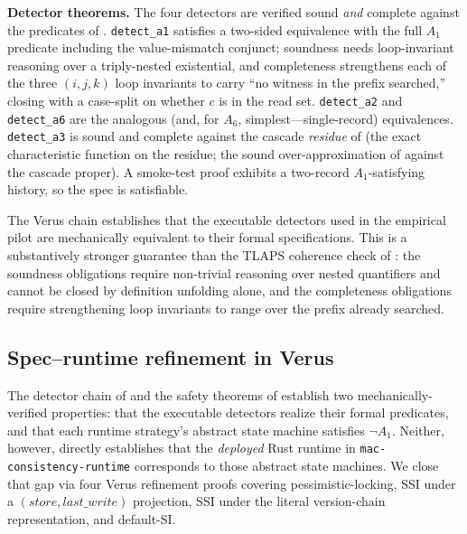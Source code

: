 \documentclass[journal,compsoc,10pt]{IEEEtran}
\theoremstyle{definition}
\theoremstyle{remark}
\newcommand{\fld}[1]{\mathit{#1}}
\begin{document}
\medskip
\noindent\textbf{Detector theorems.}
The four detectors are verified sound \emph{and} complete against the
predicates of . \texttt{detect\_a1} satisfies a
two-sided equivalence with the full $A_1$ predicate including the
value-mismatch conjunct; soundness needs loop-invariant reasoning over a
triply-nested existential, and completeness strengthens each of the three
$(i,j,k)$ loop invariants to carry ``no witness in the prefix searched,''
closing with a case-split on whether $c$ is in the read set.
\texttt{detect\_a2} and \texttt{detect\_a6} are the analogous (and, for
$A_6$, simplest---single-record) equivalences. \texttt{detect\_a3} is
sound and complete against the cascade \emph{residue} of 
(the exact characteristic function on the residue; the sound
over-approximation of  against the cascade proper). A
smoke-test proof exhibits a two-record $A_1$-satisfying history, so the
spec is satisfiable.

The Verus chain establishes that the executable detectors used in
the empirical pilot are mechanically equivalent to their formal
specifications. This is a substantively stronger guarantee than
the TLAPS coherence check of : the
soundness obligations require non-trivial reasoning over nested
quantifiers and cannot be closed by definition unfolding alone,
and the completeness obligations require strengthening loop
invariants to range over the prefix already searched.

\subsection{Spec--runtime refinement in Verus}
\label{sec:verus-refinement}
The detector chain of  and the
safety theorems of  establish two
mechanically-verified properties: that the executable detectors
realize their formal predicates, and that each runtime strategy's
abstract state machine satisfies $\neg A_1$. Neither, however,
directly establishes that the \emph{deployed} Rust runtime in
\texttt{mac-consistency-runtime} corresponds to those abstract
state machines. We close that gap via four Verus refinement
proofs covering pessimistic-locking, SSI under a
$(\fld{store},\fld{last\_write})$ projection, SSI under the
literal version-chain representation, and default-SI.
\end{document}
